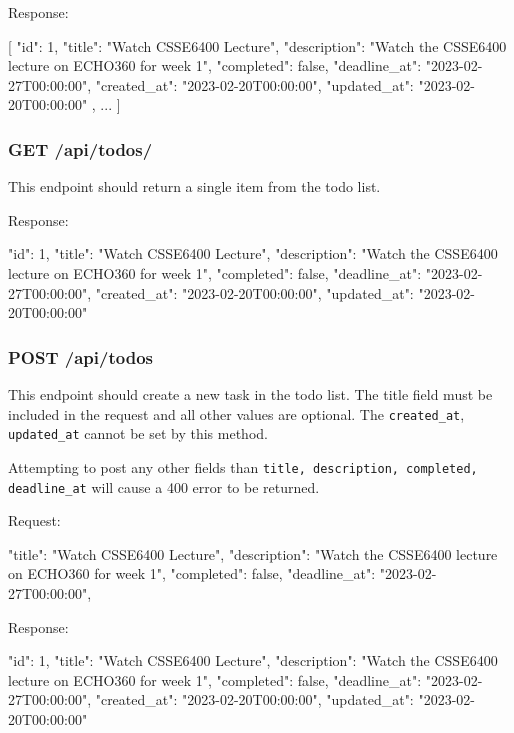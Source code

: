 \documentclass{csse4400}
\begin{document}
Response:
\begin{code}[language=json]{}
[
  {
    "id": 1,
    "title": "Watch CSSE6400 Lecture",
    "description": "Watch the CSSE6400 lecture on ECHO360 for week 1",
    "completed": false,
    "deadline_at": "2023-02-27T00:00:00",
    "created_at": "2023-02-20T00:00:00",
    "updated_at": "2023-02-20T00:00:00"
  },
  {
    ...
  }
]
\end{code}

\subsubsection{GET /api/todos/}
This endpoint should return a single item from the todo list.

Response:
\begin{code}[language=json]{}
{
  "id": 1,
  "title": "Watch CSSE6400 Lecture",
  "description": "Watch the CSSE6400 lecture on ECHO360 for week 1",
  "completed": false,
  "deadline_at": "2023-02-27T00:00:00",
  "created_at": "2023-02-20T00:00:00",
  "updated_at": "2023-02-20T00:00:00"
}
\end{code}

\subsubsection{POST /api/todos}
This endpoint should create a new task in the todo list. The title field must be included in the request and all other values are optional. The \texttt{created\_at}, \texttt{updated\_at} cannot be set by this method.

Attempting to post any other fields than \texttt{title, description, completed, deadline\_at} will cause a 400 error to be returned.

Request:
\begin{code}[language=json]{}
{
  "title": "Watch CSSE6400 Lecture",
  "description": "Watch the CSSE6400 lecture on ECHO360 for week 1",
  "completed": false,
  "deadline_at": "2023-02-27T00:00:00",
}
\end{code}

Response:
\begin{code}[language=json]{}
{
  "id": 1,
  "title": "Watch CSSE6400 Lecture",
  "description": "Watch the CSSE6400 lecture on ECHO360 for week 1",
  "completed": false,
  "deadline_at": "2023-02-27T00:00:00",
  "created_at": "2023-02-20T00:00:00",
  "updated_at": "2023-02-20T00:00:00"
}
\end{code}
\end{document}
